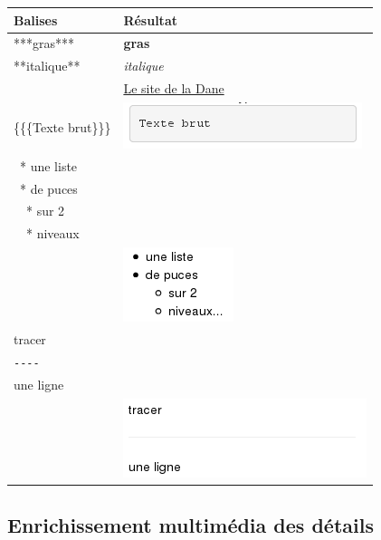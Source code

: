 {%
\begin{center}
 \begin{tabular}{|l|l|}
 \hline
  Balises & Résultat\\
  \hline
  \hline
  ***gras*** & \textbf{gras}\\
  \hline
  **italique** & \textit{italique}\\
  \hline
  [http://dane.ac-versailles.fr Le site de la Dane] & \href{http://dane.ac-versailles/fr}{Le site de la Dane}\\
  \hline
  \{\{\{Texte brut\}\}\} & \includegraphics[scale=0.7]{./images/texte_brut}\\
  \hline
  ~* une liste\\
  ~* de puces\\
  ~~* sur 2\\
  ~~* niveaux\\ & \includegraphics[scale=0.7]{./images/liste_puce}\\
  \hline
  tracer\\
  \verb|----|\\
  une ligne\\ & \includegraphics[scale=0.7]{./images/ligne_commentaire}\\
  \hline
  \end{tabular}
\end{center}

\subsection{Enrichissement multimédia des détails}\label{enrichissement_multimedia}

}
